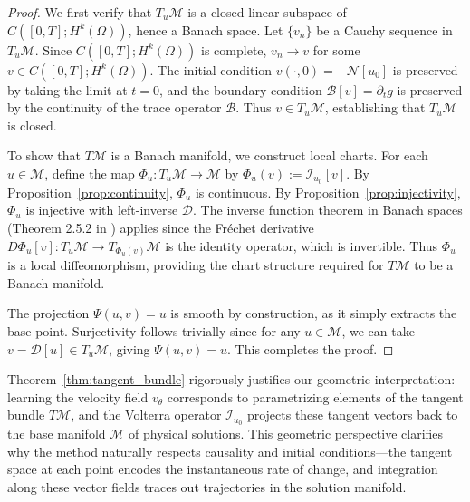 \documentclass[11pt,reqno]{amsart}
\theoremstyle{plain}
\theoremstyle{definition}
\theoremstyle{remark}
\begin{document}
\begin{proof}
We first verify that $T_u\mathcal{M}$ is a closed linear subspace of $C([0,T]; H^k(\Omega))$, hence a Banach space. Let $\{v_n\}$ be a Cauchy sequence in $T_u\mathcal{M}$. Since $C([0,T]; H^k(\Omega))$ is complete, $v_n \to v$ for some $v \in C([0,T]; H^k(\Omega))$. The initial condition $v(\cdot,0) = -\mathcal{N}[u_0]$ is preserved by taking the limit at $t=0$, and the boundary condition $\mathcal{B}[v] = \partial_t g$ is preserved by the continuity of the trace operator $\mathcal{B}$. Thus $v \in T_u\mathcal{M}$, establishing that $T_u\mathcal{M}$ is closed.

To show that $T\mathcal{M}$ is a Banach manifold, we construct local charts. For each $u \in \mathcal{M}$, define the map $\Phi_u: T_u\mathcal{M} \to \mathcal{M}$ by $\Phi_u(v) := \mathcal{I}_{u_0}[v]$. By Proposition~\ref{prop:continuity}, $\Phi_u$ is continuous. By Proposition~\ref{prop:injectivity}, $\Phi_u$ is injective with left-inverse $\mathcal{D}$. The inverse function theorem in Banach spaces (Theorem 2.5.2 in \cite{lang1995}) applies since the Fréchet derivative $D\Phi_u[v]: T_u\mathcal{M} \to T_{\Phi_u(v)}\mathcal{M}$ is the identity operator, which is invertible. Thus $\Phi_u$ is a local diffeomorphism, providing the chart structure required for $T\mathcal{M}$ to be a Banach manifold.

\noindent The projection $\Psi(u,v) = u$ is smooth by construction, as it simply extracts the base point. Surjectivity follows trivially since for any $u \in \mathcal{M}$, we can take $v = \mathcal{D}[u] \in T_u\mathcal{M}$, giving $\Psi(u,v) = u$. This completes the proof.
\end{proof}

Theorem~\ref{thm:tangent_bundle} rigorously justifies our geometric interpretation: learning the velocity field $v_\theta$ corresponds to parametrizing elements of the tangent bundle $T\mathcal{M}$, and the Volterra operator $\mathcal{I}_{u_0}$ projects these tangent vectors back to the base manifold $\mathcal{M}$ of physical solutions. This geometric perspective clarifies why the method naturally respects causality and initial conditions—the tangent space at each point encodes the instantaneous rate of change, and integration along these vector fields traces out trajectories in the solution manifold.
\end{document}
